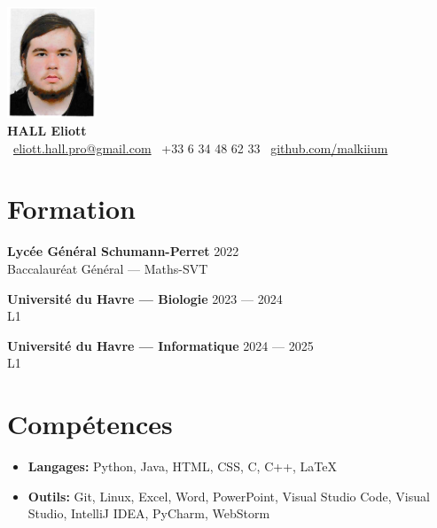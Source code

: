 \documentclass[a4paper,10pt]{article}
\begin{document}
\pagecolor{bgcolor} %
\pagestyle{empty}

\begin{center}
    \includegraphics[width=0.2\textwidth]{cvpp.png} \\
    \vspace{3mm}
    {\Huge \textbf{HALL Eliott}}\\
    \vspace{5mm}
    \faEnvelope~\href{mailto:eliott.hall.pro@gmail.com}{eliott.hall.pro@gmail.com} \quad
    \faPhone~+33 6 34 48 62 33 \quad
    \faGithub~\href{https://github.com/malkiium}{github.com/malkiium}
\end{center}

\vspace{5mm}

\section{Formation}
\textbf{Lycée Général Schumann-Perret} \hfill {2022}\\
{\color{accentcolor}Baccalauréat Général --- Maths-SVT}

\vspace{3mm}
\textbf{Université du Havre --- Biologie} \hfill {2023 --- 2024}\\
{\color{accentcolor}L1}

\vspace{3mm}
\textbf{Université du Havre --- Informatique} \hfill {2024 --- 2025}\\
{\color{accentcolor}L1}

\vspace{5mm}

\section{Compétences}
\begin{itemize}[label=\textbullet, font=\color{maincolor}\large]
    \item \textbf{Langages:} Python, Java, HTML, CSS, C, C++, LaTeX
    \item \textbf{Outils:} Git, Linux, Excel, Word, PowerPoint, Visual Studio Code, Visual Studio, IntelliJ IDEA, PyCharm, WebStorm
\end{itemize}
\end{document}
